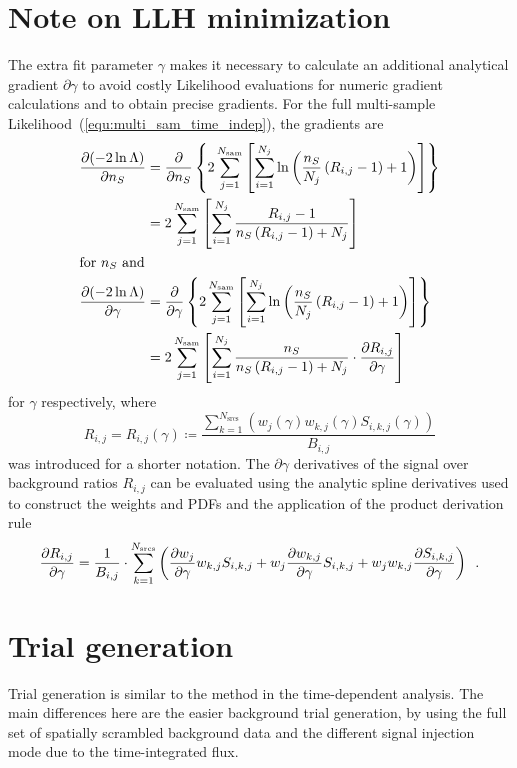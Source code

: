 \section{Note on LLH minimization}
The extra fit parameter $\gamma$ makes it necessary to calculate an additional analytical gradient $\partial{\gamma}$ to avoid costly Likelihood evaluations for numeric gradient calculations and to obtain precise gradients.
For the full multi-sample Likelihood~(\ref{equ:multi_sam_time_indep}), the gradients are
\begin{align}
  \frac{\partial (-2\ln\Lambda)}{\partial n_S}
  &= \frac{\partial }{\partial n_S}\left\{
      2\sum_{j=1}^{N_\text{sam}} \left[
        \sum_{i=1}^{N_j} \ln\left(
          \frac{n_S}{N_j}\left( R_{i,j} - 1 \right) + 1
        \right)
      \right]
    \right\} \\
  &= 2\sum_{j=1}^{N_\text{sam}} \left[
      \sum_{i=1}^{N_j}
        \frac{R_{i,j} - 1}{n_S\left( R_{i,j} - 1 \right) + N_j}
      \right] \\
  \intertext{for $n_S$ and}
  \frac{\partial (-2\ln\Lambda)}{\partial \gamma}
  &= \frac{\partial }{\partial \gamma}\left\{
      2\sum_{j=1}^{N_\text{sam}} \left[
        \sum_{i=1}^{N_j} \ln\left(
          \frac{n_S}{N_j}\left( R_{i,j} - 1 \right) + 1
        \right)
      \right]
    \right\} \\
  &= 2\sum_{j=1}^{N_\text{sam}} \left[
      \sum_{i=1}^{N_j}
        \frac{n_S}{n_S\left( R_{i,j} - 1 \right) + N_j}\cdot
        \frac{\partial R_{i,j}}{\partial \gamma}
      \right]
\end{align}
for $\gamma$ respectively, where
\begin{equation}
  R_{i,j} = R_{i,j}(\gamma)
  \coloneqq \frac{\sum_{k=1}^{N_\text{srcs}}(w_j(\gamma)
                  w_{k,j}(\gamma) S_{i,k,j}(\gamma))}{B_{i,j}}
\end{equation}
was introduced for a shorter notation.
The $\partial{\gamma}$ derivatives of the signal over background ratios $R_{i,j}$ can be evaluated using the analytic spline derivatives used to construct the  weights and PDFs and the application of the product derivation rule
\begin{equation}
  \frac{\partial R_{i,j}}{\partial \gamma}
  = \frac{1}{B_{i,j}}\cdot\sum_{k=1}^{N_\text{srcs}}\left(
      \frac{\partial w_j}{\partial \gamma} w_{k,j} S_{i,k,j} +
      w_j \frac{\partial w_{k,j}}{\partial \gamma} S_{i,k,j} +
      w_j w_{k,j} \frac{\partial S_{i,k,j}}{\partial \gamma}
    \right)
  \enspace\text{.}
\end{equation}


\section{Trial generation}
Trial generation is similar to the method in the time-dependent analysis.
The main differences here are the easier background trial generation, by using the full set of spatially scrambled background data and the different signal injection mode due to the time-integrated flux.

